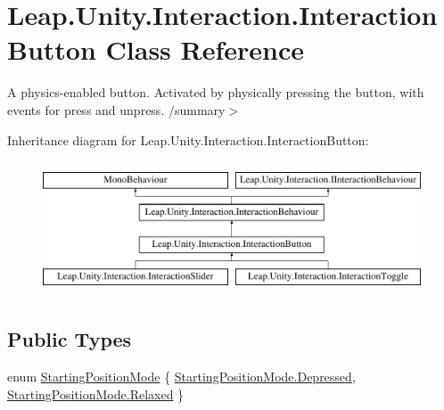 \hypertarget{class_leap_1_1_unity_1_1_interaction_1_1_interaction_button}{}\section{Leap.\+Unity.\+Interaction.\+Interaction\+Button Class Reference}
\label{class_leap_1_1_unity_1_1_interaction_1_1_interaction_button}


A physics-\/enabled button. Activated by physically pressing the button, with events for press and unpress. /summary$>$  


Inheritance diagram for Leap.\+Unity.\+Interaction.\+Interaction\+Button\+:\begin{figure}[H]
\begin{center}
\leavevmode
\includegraphics[height=4.000000cm]{class_leap_1_1_unity_1_1_interaction_1_1_interaction_button}
\end{center}
\end{figure}
\subsection*{Public Types}
\begin{DoxyCompactItemize}
\item 
enum \mbox{\hyperlink{class_leap_1_1_unity_1_1_interaction_1_1_interaction_button_a29761e33189cdf8131bb519cdc114fd2}{Starting\+Position\+Mode}} \{ \mbox{\hyperlink{class_leap_1_1_unity_1_1_interaction_1_1_interaction_button_a29761e33189cdf8131bb519cdc114fd2a83cd8cb2be2d9278f796db9daf0e61eb}{Starting\+Position\+Mode.\+Depressed}}, 
\mbox{\hyperlink{class_leap_1_1_unity_1_1_interaction_1_1_interaction_button_a29761e33189cdf8131bb519cdc114fd2a4160be5df3fc34c3b165f28616f1bd16}{Starting\+Position\+Mode.\+Relaxed}}
 \}
\end{DoxyCompactItemize}
